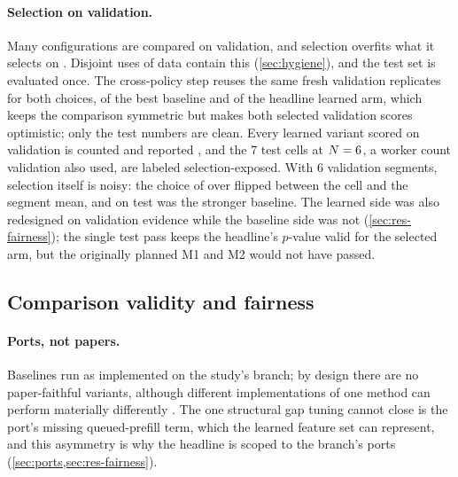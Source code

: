 \paragraph{Selection on validation.}
Many configurations are compared on validation, and selection overfits what it selects on
\citep{cawley2010overfitting}. Disjoint uses of data contain this (\cref{sec:hygiene}), and the
test set is evaluated once. The cross-policy step reuses the same fresh validation replicates for
both choices, of the best baseline and of the headline learned arm, which keeps the comparison
symmetric but makes both selected validation scores optimistic; only the test numbers are clean.
Every learned variant scored on validation is counted and reported \citep{dodge2019show}, and the 7 test cells at $N = 6$, a worker count validation also used, are
labeled selection-exposed. With 6 validation segments, selection itself is noisy: the choice of
 over  flipped between the cell and the segment mean, and
on test  was the stronger baseline. The learned side was also redesigned
on validation evidence while the baseline side was not (\cref{sec:res-fairness}); the single test pass
keeps the headline's $p$-value valid for the selected arm, but the originally planned M1 and M2 would
not have passed.

\subsection{Comparison validity and fairness}
\label{sec:threats-fairness}

\paragraph{Ports, not papers.}
Baselines run as implemented on the study's branch; by design there are no paper-faithful
variants, although different implementations of one method can perform materially differently
\citep{henderson2018matters}. The one structural gap tuning cannot close is the 
port's missing queued-prefill term, which the learned feature set can represent, and this asymmetry
is why the headline is scoped to the branch's ports (\cref{sec:ports,sec:res-fairness}).

